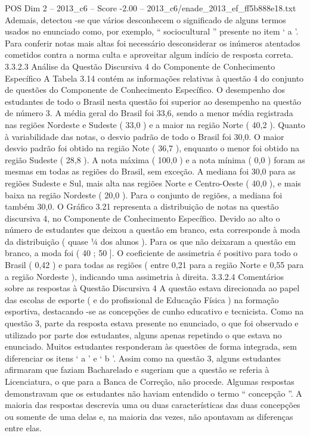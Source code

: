 \begin{textsample}{POS Dim 2 – 2013\_c6 – Score -2.00 – 2013\_c6/enade\_2013\_ef\_ff5b888e18.txt}
Ademais, detectou -se que vários desconhecem o significado de alguns termos usados no enunciado como, por exemplo, “ sociocultural ” presente no item ‘ a ’.
Para conferir notas mais altas foi necessário desconsiderar os inúmeros atentados cometidos contra a norma culta e aproveitar algum indício de resposta correta. 3.3.2.3 Análise da Questão Discursiva 4 do Componente de Conhecimento Específico A Tabela 3.14 contém as informações relativas à questão 4 do conjunto de questões do Componente de Conhecimento Específico.
O desempenho dos estudantes de todo o Brasil nesta questão foi superior ao desempenho na questão de número 3.
A média geral do Brasil foi 33,6, sendo a menor média registrada nas regiões Nordeste e Sudeste ( 33,0 ) e a maior na região Norte ( 40,2 ).
Quanto à variabilidade das notas, o desvio padrão de todo o Brasil foi 30,0.
O maior desvio padrão foi obtido na região Note ( 36,7 ), enquanto o menor foi obtido na região Sudeste ( 28,8 ).
A nota máxima ( 100,0 ) e a nota mínima ( 0,0 ) foram as mesmas em todas as regiões do Brasil, sem exceção.
A mediana foi 30,0 para as regiões Sudeste e Sul, mais alta nas regiões Norte e Centro-Oeste ( 40,0 ), e mais baixa na região Nordeste ( 20,0 ).
Para o conjunto de regiões, a mediana foi também 30,0.
O Gráfico 3.21 representa a distribuição de notas na questão discursiva 4, no Componente de Conhecimento Específico.
Devido ao alto o número de estudantes que deixou a questão em branco, esta corresponde à moda da distribuição ( quase ¼ dos alunos ).
Para os que não deixaram a questão em branco, a moda foi ( 40 ; 50 ].
O coeficiente de assimetria é positivo para todo o Brasil ( 0,42 ) e para todas as regiões ( entre 0,21 para a região Norte e 0,55 para a região Nordeste ), indicando uma assimetria à direita. 3.3.2.4 Comentários sobre as respostas à Questão Discursiva 4 A questão estava direcionada ao papel das escolas de esporte ( e do profissional de Educação Física ) na formação esportiva, destacando -se as concepções de cunho educativo e tecnicista.
Como na questão 3, parte da resposta estava presente no enunciado, o que foi observado e utilizado por parte dos estudantes, alguns apenas repetindo o que estava no enunciado.
Muitos estudantes responderam às questões de forma integrada, sem diferenciar os itens ‘ a ’ e ‘ b ’.
Assim como na questão 3, alguns estudantes afirmaram que faziam Bacharelado e sugeriam que a questão se referia à Licenciatura, o que para a Banca de Correção, não procede.
Algumas respostas demonstravam que os estudantes não haviam entendido o termo “ concepção ”.
A maioria das respostas descrevia uma ou duas características das duas concepções ou somente de uma delas e, na maioria das vezes, não apontavam as diferenças entre elas.

\end{textsample}
